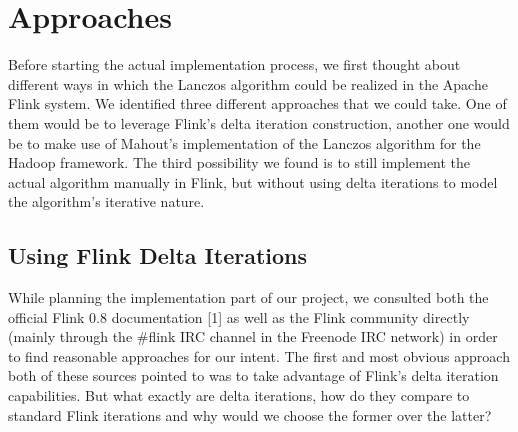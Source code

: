 \section{Approaches}

Before starting the actual implementation process, we first thought about different
ways in which the Lanczos algorithm could be realized in the Apache Flink system. We
identified three different approaches that we could take. One of them would be to
leverage Flink's delta iteration construction, another one would be to make use of
Mahout's implementation of the Lanczos algorithm for the Hadoop framework. The third
possibility we found is to still implement the actual algorithm manually in Flink, but
without using delta iterations to model the algorithm's iterative nature.

\subsection{Using Flink Delta Iterations}


While planning the implementation part of our project, we consulted both the official
Flink 0.8 documentation [1] as well as the Flink community directly (mainly through
the \#flink IRC channel in the Freenode IRC network) in order to find reasonable
approaches for our intent. The first and most obvious approach both of these sources 
pointed to was to take advantage of Flink's delta iteration capabilities. But what
exactly are delta iterations, how do they compare to standard Flink iterations and why 
would we choose the former over the latter?


